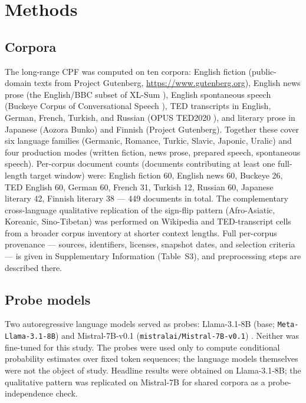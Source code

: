 \documentclass[11pt]{article}
\begin{document}
\section{Methods}

\subsection{Corpora}

The long-range CPF was computed on ten corpora: English fiction (public-domain texts
from Project Gutenberg, \url{https://www.gutenberg.org}), English news prose (the English/BBC
subset of XL-Sum \citep{hasan2021xlsum}), English spontaneous speech (Buckeye Corpus of Conversational
Speech \citep{pitt2007buckeye}), TED transcripts in English, German, French, Turkish, and Russian
(OPUS TED2020 \citep{reimers2020making, tiedemann2012parallel}), and literary prose in Japanese
(Aozora Bunko) and Finnish (Project Gutenberg). Together these cover six language families (Germanic, Romance, Turkic,
Slavic, Japonic, Uralic) and four production modes (written fiction, news prose, prepared
speech, spontaneous speech). Per-corpus document counts (documents contributing at least one
full-length target window) were: English fiction 60, English news 60, Buckeye 26, TED English 60,
German 60, French 31, Turkish 12, Russian 60, Japanese literary 42, Finnish literary 38 --- 449
documents in total. The complementary cross-language qualitative replication of the sign-flip
pattern (Afro-Asiatic, Koreanic, Sino-Tibetan) was performed on Wikipedia and TED-transcript cells
from a broader corpus inventory at shorter context lengths. Full per-corpus provenance --- sources,
identifiers, licenses, snapshot dates, and selection criteria --- is given in Supplementary
Information (Table~S3), and preprocessing steps are described there.

\subsection{Probe models}

Two autoregressive language models served as probes: Llama-3.1-8B (base;
\texttt{Meta-Llama-3.1-8B}) \citep{llama3herd2024} and Mistral-7B-v0.1
(\texttt{mistralai/Mistral-7B-v0.1}) \citep{jiang2023mistral}. Neither was fine-tuned for this study. The
probes were used only to compute conditional probability estimates over fixed token sequences;
the language models themselves were not the object of study. Headline results were obtained on
Llama-3.1-8B; the qualitative pattern was replicated on Mistral-7B for shared corpora as a
probe-independence check.
\end{document}
